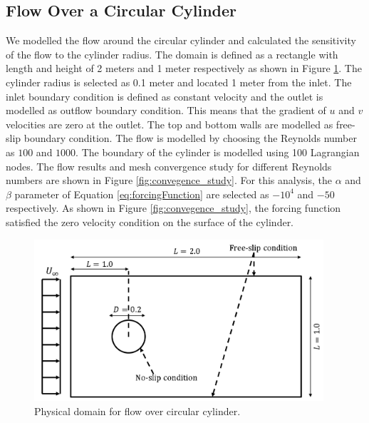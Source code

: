 \documentclass{aiaa-pretty}
\begin{document}
\subsection{Flow Over a Circular Cylinder}
We modelled the flow around the circular cylinder and calculated the sensitivity of the flow to the cylinder radius. The domain is defined as a rectangle with length and height of 2 meters and 1 meter respectively as shown in Figure \ref{fig:cylinderDomain}. The cylinder radius is selected as 0.1 meter and located 1 meter from the inlet. The inlet boundary condition is defined as constant velocity and the outlet is modelled as outflow boundary condition. This means that the gradient of $u$ and $v$ velocities are zero at the outlet. The top and bottom walls are modelled as free-slip boundary condition. The flow is modelled by choosing the Reynolds number as $100$ and $1000$. The boundary of the cylinder is modelled using 100 Lagrangian nodes. The flow results and mesh convergence study for different Reynolds numbers are shown in Figure \ref{fig:convegence_study}. For this analysis, the $\alpha$ and $\beta$ parameter of Equation \eqref{eq:forcingFunction} are selected as $-10^4$ and $-50$ respectively. As shown in Figure \ref{fig:convegence_study}, the forcing function satisfied the zero velocity condition on the surface of the cylinder.

%
\begin{figure}[H]
	\centering
	\includegraphics[height=6.0cm]{figure/cylinder/domain.png}
	\caption{Physical domain for flow over circular cylinder.}
	\label{fig:cylinderDomain}
\end{figure}
%
\end{document}
